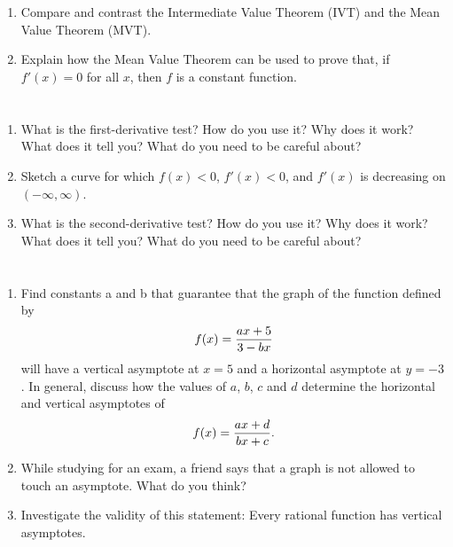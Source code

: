 \section{}
\begin{enumerate}%

\item  Compare and contrast the Intermediate Value Theorem (IVT) and the Mean Value Theorem (MVT).  

\item  Explain how the Mean Value Theorem can be used to prove that, if $f'\left( x \right) = 0$ for all $x$, then $f$ is a constant function.


\end{enumerate}
\section{}
\begin{enumerate}%

\item  What is the first-derivative test?  How do you use it?  Why does it work?  What does it tell you?  What do you need to be careful about?

\item  Sketch a curve for which $f(x) < 0$, $f'(x)< 0$, and $f'(x)$ is decreasing on $(-\infty, \infty)$.

\item  What is the second-derivative test?  How do you use it?  Why does it work?  What does it tell you?  What do you need to be careful about?



\end{enumerate}
\section{}
\begin{enumerate}%

\item  Find constants a and b that guarantee that the graph of the function defined by $$f(x) = {{ax + 5} \over {3 - bx}}$$ will have a vertical asymptote at $x = 5$ and a horizontal asymptote at 
$y = -3$. \cite{SBS}  In general, discuss how the values of $a$, $b$, $c$ and $d$ determine the horizontal and vertical asymptotes of $$f(x) = {{ax + d} \over {bx + c}}.$$


\item  While studying for an exam, a friend says that a graph is not allowed to touch an asymptote.  What do you think?



\item  Investigate the validity of this statement:  Every rational function has vertical asymptotes.



\end{enumerate}
